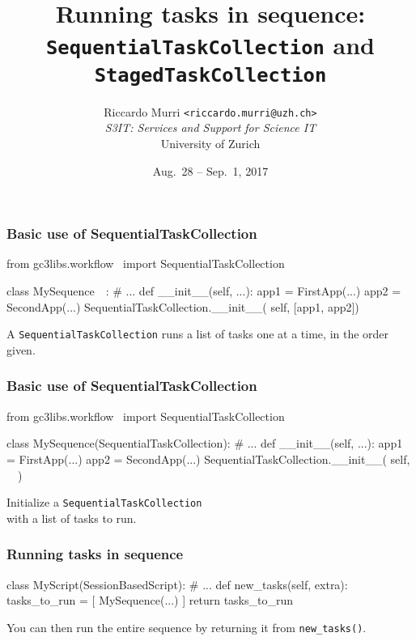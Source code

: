 \documentclass[english,serif,mathserif,xcolor=pdftex,dvipsnames,table]{beamer}
\title[Sequencing tasks]{%
  Running tasks in sequence: \\
  \texttt{SequentialTaskCollection} and \texttt{StagedTaskCollection}
}
\author[R. Murri, S3IT UZH]{%
  Riccardo Murri \texttt{<riccardo.murri@uzh.ch>}
  \\[1ex]
  \emph{S3IT: Services and Support for Science IT}
  \\[1ex]
  University of Zurich
}
\date{Aug.~28 -- Sep.~1, 2017}
\begin{document}
\maketitle


\begin{frame}[fragile]
  \frametitle{Basic use of SequentialTaskCollection}

\begin{python}
from gc3libs.workflow \
  import SequentialTaskCollection

class MySequence~~:
  # ...
  def __init__(self, ...):
    app1 = FirstApp(...)
    app2 = SecondApp(...)
    SequentialTaskCollection.__init__(
      self, [app1, app2])
\end{python}

  \+
  A \texttt{SequentialTaskCollection} runs a list of tasks one at a time, in the order given.
\end{frame}


\begin{frame}[fragile]
  \frametitle{Basic use of SequentialTaskCollection}

\begin{python}
from gc3libs.workflow \
  import SequentialTaskCollection

class MySequence(SequentialTaskCollection):
  # ...
  def __init__(self, ...):
    app1 = FirstApp(...)
    app2 = SecondApp(...)
    SequentialTaskCollection.__init__(
      self, ~~)
\end{python}

  \+
  Initialize a \texttt{SequentialTaskCollection} \\
  with a list of tasks to run.
\end{frame}


\begin{frame}[fragile]
  \frametitle{Running tasks in sequence}

\begin{python}
class MyScript(SessionBasedScript):
  # ...
  def new_tasks(self, extra):
    tasks_to_run = [
      MySequence(...)
    ]
    return tasks_to_run
\end{python}

  \+ You can then run the entire sequence by returning it from
  \lstinline|new_tasks()|.
\end{frame}
\end{document}
